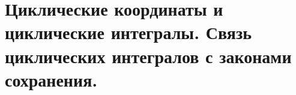 \chapter{Циклические координаты и циклические интегралы. Связь циклических
интегралов с законами сохранения.}

\newpage
